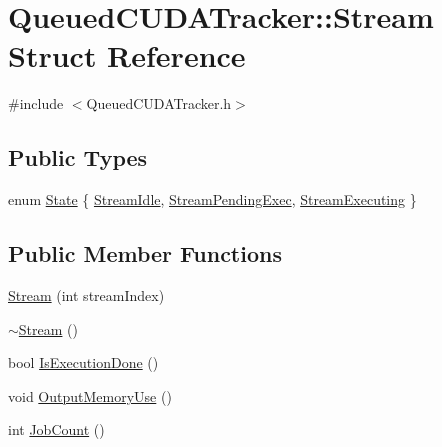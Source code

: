 \hypertarget{struct_queued_c_u_d_a_tracker_1_1_stream}{}\section{Queued\+C\+U\+D\+A\+Tracker\+:\+:Stream Struct Reference}
\label{struct_queued_c_u_d_a_tracker_1_1_stream}


{\ttfamily \#include $<$Queued\+C\+U\+D\+A\+Tracker.\+h$>$}

\subsection*{Public Types}
\begin{DoxyCompactItemize}
\item 
enum \hyperlink{struct_queued_c_u_d_a_tracker_1_1_stream_a836e14e096ea57bd153e812ce1e0a1f2}{State} \{ \hyperlink{struct_queued_c_u_d_a_tracker_1_1_stream_a836e14e096ea57bd153e812ce1e0a1f2a016601712772605b4535e857fddbab0f}{Stream\+Idle}, 
\hyperlink{struct_queued_c_u_d_a_tracker_1_1_stream_a836e14e096ea57bd153e812ce1e0a1f2a871a26b9ee42c5b70b5d3d90b8fc35c4}{Stream\+Pending\+Exec}, 
\hyperlink{struct_queued_c_u_d_a_tracker_1_1_stream_a836e14e096ea57bd153e812ce1e0a1f2a62c88c473a98aed73b5fdf061753c63a}{Stream\+Executing}
 \}
\end{DoxyCompactItemize}
\subsection*{Public Member Functions}
\begin{DoxyCompactItemize}
\item 
\hyperlink{struct_queued_c_u_d_a_tracker_1_1_stream_a2c2931936619d274f8b5b9176ab81c63}{Stream} (int stream\+Index)
\item 
\hyperlink{struct_queued_c_u_d_a_tracker_1_1_stream_ade688123c51556e0567b807bbd908000}{$\sim$\+Stream} ()
\item 
bool \hyperlink{struct_queued_c_u_d_a_tracker_1_1_stream_ac6ba04f617190c414e44c7ec7e8fa700}{Is\+Execution\+Done} ()
\item 
void \hyperlink{struct_queued_c_u_d_a_tracker_1_1_stream_aa86b9870b3eebae2b7518cac62c410ad}{Output\+Memory\+Use} ()
\item 
int \hyperlink{struct_queued_c_u_d_a_tracker_1_1_stream_a3102e3a6fae6fb4d3f515e0f592422cd}{Job\+Count} ()
\end{DoxyCompactItemize}
